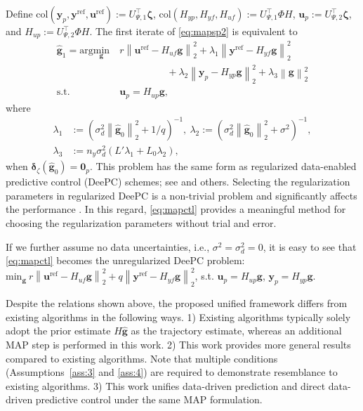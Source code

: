 \documentclass{ifacconf}
\newcommand{\norm}[1]{\left\lVert#1\right\rVert}
\newcommand{\col}[1]{\mathrm{col}\left(#1\right)}
\begin{document}
Define $\col{\mathbf{y}_p,\mathbf{y}^\mathrm{ref},\mathbf{u}^\mathrm{ref}}:=U_{\Psi,1}^\top\boldsymbol{\zeta}$, $\col{H_{yp},H_{yf},H_{uf}}:=U_{\Psi,1}^\top\Phi H$, $\mathbf{u}_p:=U_{\Psi,2}^\top\boldsymbol{\zeta}$, and $H_{up}:=U_{\Psi,2}^\top\Phi H$. The first iterate of \eqref{eq:mapsp2} is equivalent to
\begin{equation}
    \begin{aligned}
        \hat{\mathbf{g}}_1=\mathrm{arg}\underset{\mathbf{g}}{\mathrm{min}}&\ r\norm{\mathbf{u}^\mathrm{ref}-H_{uf}\mathbf{g}}_2^2+\lambda_1\norm{\mathbf{y}^\mathrm{ref}-H_{yf}\mathbf{g}}_2^2\\&\qquad\qquad\quad+\lambda_2\norm{\mathbf{y}_p-H_{yp}\mathbf{g}}_2^2+\lambda_3\norm{\mathbf{g}}_2^2\\
        \mathrm{s.t.}&\ \mathbf{u}_p=H_{up}\mathbf{g},
    \end{aligned}
    \label{eq:mapctl}
\end{equation}
where
\begin{align*}
    \lambda_1&:=\left(\sigma_d^2\norm{\hat{\mathbf{g}}_0}_2^2+1/q\right)^{-1},\ \lambda_2:=\left(\sigma_d^2\norm{\hat{\mathbf{g}}_0}_2^2+\sigma^2\right)^{-1},\\
    \lambda_3&:=n_y\sigma_d^2\left(L'\lambda_1+L_0\lambda_2\right),
\end{align*}
when $\boldsymbol{\delta}_\zeta(\hat{\mathbf{g}}_0)=\mathbf{0}_p$. This problem has the same form as regularized data-enabled predictive control (DeePC) schemes; see \cite{Coulson_2019,Berberich_2021} and others. Selecting the regularization parameters in regularized DeePC is a non-trivial problem and significantly affects the performance \citep{dorfler2022bridging}. In this regard, \eqref{eq:mapctl} provides a meaningful method for choosing the regularization parameters without trial and error.
\begin{rem}
If we further assume no data uncertainties, i.e., $\sigma^2=\sigma_d^2=0$, it is easy to see that \eqref{eq:mapctl} becomes the unregularized DeePC problem: $\mathrm{min}_\mathbf{g}\ r\norm{\mathbf{u}^\mathrm{ref}-H_{uf}\mathbf{g}}_2^2+q\norm{\mathbf{y}^\mathrm{ref}-H_{yf}\mathbf{g}}_2^2$, s.t. $\mathbf{u}_p=H_{up}\mathbf{g}$, $\mathbf{y}_p=H_{yp}\mathbf{g}$.
\end{rem}
Despite the relations shown above, the proposed unified framework differs from existing algorithms in the following ways. 1) Existing algorithms typically solely adopt the prior estimate $H\hat{\mathbf{g}}$ as the trajectory estimate, whereas an additional MAP step is performed in this work. 2) This work provides more general results compared to existing algorithms. Note that multiple conditions (Assumptions~\ref{ass:3} and \ref{ass:4}) are required to demonstrate resemblance to existing algorithms. 3) This work unifies data-driven prediction and direct data-driven predictive control under the same MAP formulation.
\end{document}
